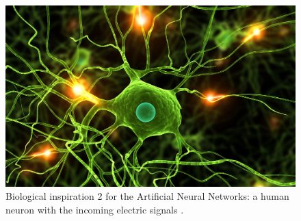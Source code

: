 \begin{figure}[!htb]
\centering
\includegraphics[width=.50\columnwidth]{images/049neuron1}
\caption[Biological inspiration 2]{Biological inspiration 2 for the Artificial
Neural Networks: a human neuron with the incoming electric signals
\cite{RefWorks:158}.}
\label{fig:049neuron1}
\end{figure}